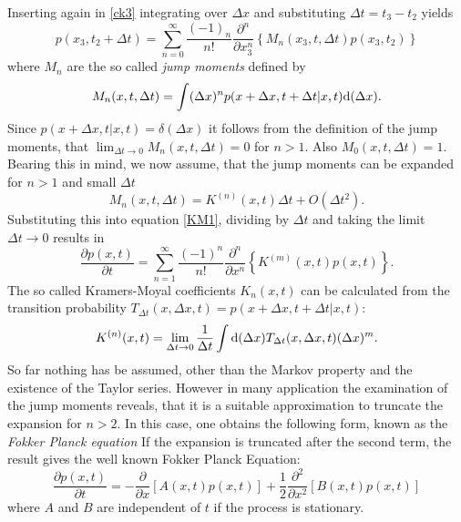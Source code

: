 Inserting again in \eqref{ck3} integrating over $\Delta x$ and substituting $\Delta t = t_3 - t_2$ yields
\begin{equation}
    p(x_3,t_2 + \Delta t) = \sum_{n=0}^{\infty} \frac{(-1)_{n}}{n!}\frac{\partial^{n}}{\partial x_3^{n}}\left\{ M_{n}(x_3,t,\Delta t) p(x_3,t_2) \right\}
    \label{KM1}
\end{equation}
where $M_n$ are the so called \textit{jump moments} defined by
\begin{equation}
    M_n(x,t,\Delta t) = \int (\Delta x)^{n} p(x + \Delta x, t + \Delta t | x, t) {\rm d} (\Delta x).
    \label{Jump_moments}
\end{equation}
Since $p(x+\Delta x, t|x,t) = \delta (\Delta x)$ it follows from the definition of the jump moments, that $\lim_{\Delta t \rightarrow 0} M_{n}(x,t,\Delta t) = 0$ for $n > 1$. Also $M_{0}(x,t,\Delta t) = 1$. Bearing this in mind, we now assume, that the jump moments can be expanded for $n > 1$ and small $\Delta t$
\begin{equation}
    M_{n}(x,t,\Delta t) = K^{(n)}(x,t)\Delta t + O(\Delta t^{2}).
\end{equation}
Substituting this into equation \eqref{KM1}, dividing by $\Delta t$ and taking the limit $\Delta t \rightarrow 0$ results in 
\begin{equation}
    \frac{\partial p(x,t)}{\partial t} = \sum_{n = 1}^{\infty}\frac{(-1)^{n}}{n!}\frac{\partial^n}{\partial x^n} \left\{ K^{(m)}(x,t) p(x,t) \right\}.
    \label{Kramers Moyal expansion}
\end{equation}
The so called Kramers-Moyal coefficients $K_{n}(x,t)$ can be calculated from the transition probability $T_{\Delta t}(x,\Delta x,t) = p(x+\Delta x,t+\Delta t | x, t)$:
\begin{equation}
    K^{(n)}(x,t) = \lim_{\Delta t \rightarrow 0} \frac{1}{\Delta t} \int {\rm d}(\Delta x) T_{\Delta t}(x,\Delta x,t) (\Delta x)^m .
    \label{jump moments}
\end{equation}
So far nothing has be assumed, other than the Markov property and the existence of the Taylor series. However in many application the examination of the jump moments reveals, that it is a suitable approximation to truncate the expansion for $n>2$. In this case, one obtains the following form, known as the \textit{Fokker Planck equation}   
If the expansion is truncated after the second term, the result gives the well known Fokker Planck Equation:
\begin{equation}
    \frac{\partial p(x,t)}{\partial t} = - \frac{\partial}{\partial x} \left[A(x,t)p(x,t) \right] + \frac{1}{2}\frac{\partial^2}{\partial x^2}\left[ B(x,t)p(x,t) \right] 
    \label{FPE}
\end{equation}
where $A$ and $B$ are independent of $t$ if the process is stationary. \\

